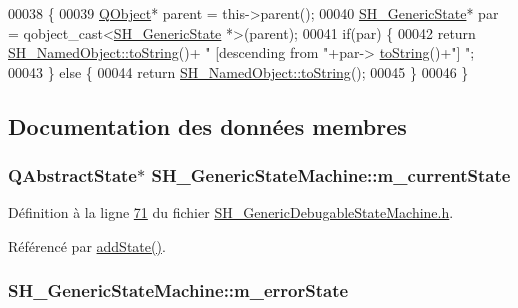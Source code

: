 \begin{DoxyCode}
00038 \{
00039     \hyperlink{classQObject}{QObject}* parent = this->parent();
00040     \hyperlink{classSH__GenericState}{SH\_GenericState}* par = qobject\_cast<\hyperlink{classSH__GenericState}{SH\_GenericState} *>(parent);
00041     \textcolor{keywordflow}{if}(par) \{
00042         \textcolor{keywordflow}{return} \hyperlink{classSH__NamedObject_a9f4b19df6a96a17daaf1060b3019ef47}{SH\_NamedObject::toString}()+ \textcolor{stringliteral}{" [descending from "}+par->
      \hyperlink{classSH__GenericState_a7779babbb40f3f8faa71112204d9804f}{toString}()+\textcolor{stringliteral}{"] "};
00043     \} \textcolor{keywordflow}{else} \{
00044         \textcolor{keywordflow}{return} \hyperlink{classSH__NamedObject_a9f4b19df6a96a17daaf1060b3019ef47}{SH\_NamedObject::toString}();
00045     \}
00046 \}
\end{DoxyCode}


\subsection{Documentation des données membres}
\hypertarget{classSH__GenericStateMachine_a67b2e327c47acb0e3149b99e4ea1311e}{
\subsubsection[{m\-\_\-current\-State}]{\setlength{\rightskip}{0pt plus 5cm}Q\-Abstract\-State$\ast$ S\-H\-\_\-\-Generic\-State\-Machine\-::m\-\_\-current\-State\hspace{0.3cm}{\ttfamily [private]}}}\label{classSH__GenericStateMachine_a67b2e327c47acb0e3149b99e4ea1311e}


Définition à la ligne \hyperlink{SH__GenericDebugableStateMachine_8h_source_l00071}{71} du fichier \hyperlink{SH__GenericDebugableStateMachine_8h_source}{S\-H\-\_\-\-Generic\-Debugable\-State\-Machine.\-h}.



Référencé par \hyperlink{classSH__GenericStateMachine_af4402993e916573a589c9d28158b28d8}{add\-State()}.

\hypertarget{classSH__GenericStateMachine_acdf020d8c235f727096da9e613d7e4d7}{
\subsubsection[{m\-\_\-error\-State}]{\setlength{\rightskip}{0pt plus 5cm}S\-H\-\_\-\-Generic\-State\-Machine\-::m\-\_\-error\-State\hspace{0.3cm}{\ttfamily [private]}}}\label{classSH__GenericStateMachine_acdf020d8c235f727096da9e613d7e4d7}


